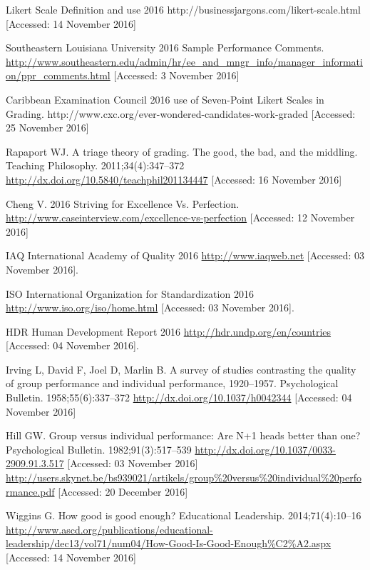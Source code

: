 \documentclass[numbers,sort&compress]{IntechOpen-Book}%
\begin{document}
\begin{backmatter}
\begin{thebibliography}{99}
Likert Scale Definition and use 2016 http://businessjargons.com/likert-scale.html [Accessed: 14 November 2016]

Southeastern Louisiana University 2016 Sample Performance Comments. \url{http://www.southeastern.edu/admin/hr/ee_and_mngr_info/manager_information/ppr_comments.html} [Accessed: 3 November 2016]

Caribbean Examination Council 2016 use of Seven-Point Likert Scales in Grading. http://www.cxc.org/ever-wondered-candidates-work-graded [Accessed: 25 November 2016]

Rapaport WJ. A triage theory of grading. The good, the bad, and the middling. Teaching Philosophy. 2011;34(4):347--372 \url{http://dx.doi.org/10.5840/teachphil201134447} [Accessed: 16 November 2016]

Cheng V. 2016 Striving for Excellence Vs. Perfection. \url{http://www.caseinterview.com/excellence-vs-perfection} [Accessed: 12 November 2016]

IAQ International Academy of Quality 2016 \url{http://www.iaqweb.net} [Accessed: 03 November 2016].

ISO International Organization for Standardization 2016 \url{http://www.iso.org/iso/home.html} [Accessed: 03 November 2016].

HDR Human Development Report 2016 \url{http://hdr.undp.org/en/countries} [Accessed: 04 November 2016].

Irving L, David F, Joel D, Marlin B. A survey of studies contrasting the quality of group performance and individual performance, 1920--1957. Psychological Bulletin. 1958;55(6):337--372 \url{http://dx.doi.org/10.1037/h0042344} [Accessed: 04 November 2016]

Hill GW. Group versus individual performance: Are N+1 heads better than one? Psychological Bulletin. 1982;91(3):517--539 \url{http://dx.doi.org/10.1037/0033-2909.91.3.517} [Accessed: 03 November 2016] \url{http://users.skynet.be/bs939021/artikels/group\%20versus\%20individual\%20performance.pdf} [Accessed: 20 December 2016]

Wiggins G. How good is good enough? Educational Leadership. 2014;71(4):10--16 \url{http://www.ascd.org/publications/educational-leadership/dec13/vol71/num04/How-Good-Is-Good-Enough\%C2\%A2.aspx} [Accessed: 14 November 2016]


\end{thebibliography}
\end{backmatter}
\end{document}
